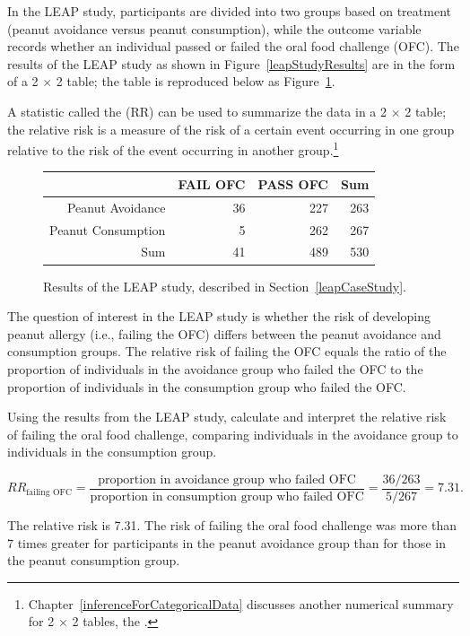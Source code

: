 In the LEAP study, participants are divided into two groups based on treatment (peanut avoidance versus peanut consumption), while the outcome variable records whether an individual passed or failed the oral food challenge (OFC). The results of the LEAP study as shown in Figure~\ref{leapStudyResults} are in the form of a 2 $\times$ 2 table; the table is reproduced below as Figure~\ref{leapStudyResultsRR}.

A statistic called the  (RR) can be used to summarize the data in a 2 $\times$ 2 table; the relative risk is a measure of the risk of a certain event occurring in one group relative to the risk of the event occurring in another group.\footnote{Chapter~\ref{inferenceForCategoricalData} discusses another numerical summary for 2 $\times$ 2 tables, the .}  


\begin{figure}[ht]
	\centering
	\begin{tabular}{rrrr}
		\hline
		& FAIL OFC & PASS OFC & Sum \\ 
		\hline
		Peanut Avoidance & 36 & 227 & 263 \\ 
		Peanut Consumption & 5 & 262 & 267 \\ 
		Sum & 41 & 489 & 530 \\ 
		\hline
	\end{tabular}
	\caption{Results of the LEAP study, described in Section~\ref{leapCaseStudy}.}
	\label{leapStudyResultsRR}
\end{figure}

The question of interest in the LEAP study is whether the risk of developing peanut allergy (i.e., failing the OFC) differs between the peanut avoidance and consumption groups. The relative risk of failing the OFC equals the ratio of the proportion of individuals in the avoidance group who failed the OFC to the proportion of individuals in the consumption group who failed the OFC.

\begin{examplewrap}
\begin{nexample}{Using the results from the LEAP study, calculate and interpret the relative risk of failing the oral food challenge, comparing individuals in the avoidance group to individuals in the consumption group.}
	
\[RR_{\textrm{failing OFC}} = \dfrac{\textrm{proportion in avoidance group who failed OFC}}{\textrm{proportion in consumption group who failed OFC}} = \dfrac{36/263}{5/267} = 7.31. \]

The relative risk is 7.31. The risk of failing the oral food challenge was more than 7 times greater for participants in the peanut avoidance group than for those in the peanut consumption group.
\end{nexample}
\end{examplewrap}

